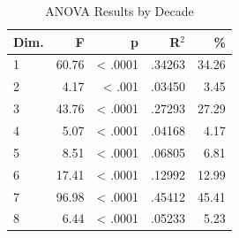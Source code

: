 \begin{table}[H]
  \centering
  \caption{ANOVA Results by Decade}
  \label{tab:anova_decade}
  \begin{tabular}{l r r r r}
    Dim. & F & p & R$^2$ & \% \\
    \hline
    1 & 60.76 & < .0001 & .34263 & 34.26 \\
    2 & 4.17 & < .001 & .03450 & 3.45 \\
    3 & 43.76 & < .0001 & .27293 & 27.29 \\
    4 & 5.07 & < .0001 & .04168 & 4.17 \\
    5 & 8.51 & < .0001 & .06805 & 6.81 \\
    6 & 17.41 & < .0001 & .12992 & 12.99 \\
    7 & 96.98 & < .0001 & .45412 & 45.41 \\
    8 & 6.44 & < .0001 & .05233 & 5.23 \\
  \end{tabular}
\end{table}
